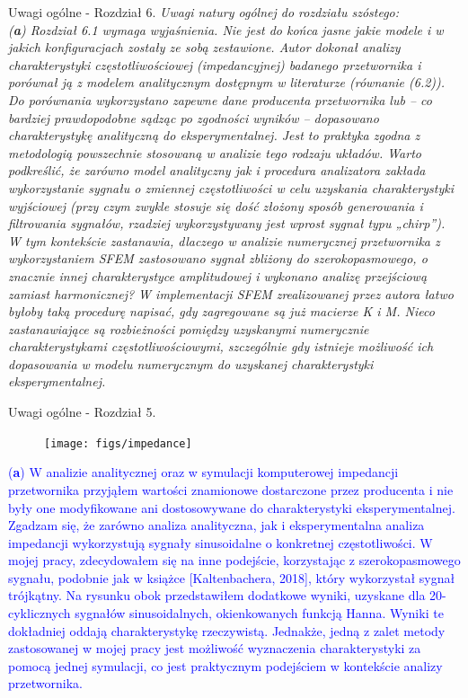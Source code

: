 \documentclass[10pt,aspectratio=169]{beamer} %
\begin{document}
\begin{frame}[label=frame22]{Uwagi ogólne - Rozdział 6.}\justifying
\small{\textit{Uwagi natury ogólnej do rozdziału szóstego:\\
(\textbf{a}) Rozdział 6.1 wymaga wyjaśnienia. Nie jest do końca jasne jakie modele i w jakich konfiguracjach zostały ze sobą zestawione. Autor dokonał analizy charakterystyki częstotliwościowej (impedancyjnej) badanego przetwornika i porównał ją z modelem analitycznym dostępnym w literaturze (równanie (6.2)). Do porównania wykorzystano zapewne dane producenta przetwornika lub – co bardziej prawdopodobne sądząc po zgodności wyników – dopasowano charakterystykę analityczną do eksperymentalnej. Jest to praktyka zgodna z metodologią powszechnie stosowaną w analizie tego rodzaju układów. Warto podkreślić, że zarówno model analityczny jak i procedura analizatora zakłada wykorzystanie sygnału o zmiennej częstotliwości w celu uzyskania charakterystyki wyjściowej (przy czym zwykle stosuje się dość złożony sposób generowania i filtrowania sygnałów, rzadziej wykorzystywany jest wprost sygnał typu „chirp”). W tym kontekście zastanawia, dlaczego w analizie numerycznej przetwornika z wykorzystaniem SFEM zastosowano sygnał zbliżony do szerokopasmowego, o znacznie innej charakterystyce amplitudowej i wykonano analizę przejściową zamiast	harmonicznej? W implementacji SFEM zrealizowanej przez autora łatwo byłoby taką procedurę napisać, gdy zagregowane są już macierze K i M. Nieco zastanawiające są rozbieżności pomiędzy uzyskanymi numerycznie charakterystykami częstotliwościowymi, szczególnie gdy istnieje możliwość ich dopasowania w modelu	numerycznym do uzyskanej charakterystyki eksperymentalnej.}}
\end{frame}

\begin{frame}[label=frame23]{Uwagi ogólne - Rozdział 5.}\justifying
	\begin{figure}
		\centering
		\texttt{[image: figs/impedance]}
		\label{fig:impedance}
	\end{figure}
\textcolor{blue}{(\textbf{a}) W analizie analitycznej oraz w symulacji komputerowej impedancji przetwornika przyjąłem wartości znamionowe dostarczone przez producenta i nie były one modyfikowane ani dostosowywane do charakterystyki eksperymentalnej. Zgadzam się, że zarówno analiza analityczna, jak i eksperymentalna analiza impedancji wykorzystują sygnały sinusoidalne o konkretnej częstotliwości. W mojej pracy, zdecydowałem się na inne podejście, korzystając z szerokopasmowego sygnału, podobnie jak w książce [Kaltenbachera, 2018], który wykorzystał sygnał trójkątny. Na rysunku obok przedstawiłem dodatkowe wyniki, uzyskane dla 20-cyklicznych sygnałów sinusoidalnych, okienkowanych funkcją Hanna. Wyniki te dokładniej oddają charakterystykę rzeczywistą. Jednakże, jedną z zalet metody zastosowanej w mojej pracy jest możliwość wyznaczenia charakterystyki za pomocą jednej symulacji, co jest praktycznym podejściem w kontekście analizy przetwornika.}
\end{frame}
\end{document}
